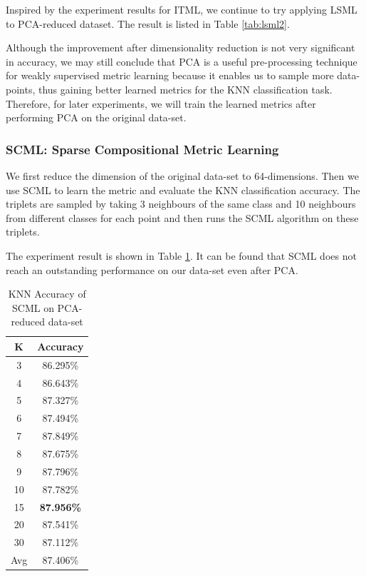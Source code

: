 Inspired by the experiment results for ITML, we continue to try applying LSML to PCA-reduced dataset. The result is listed in Table \ref{tab:lsml2}. 

Although the improvement after dimensionality reduction is not very significant in accuracy, we may still conclude that PCA is a useful pre-processing technique for weakly supervised metric learning because it enables us to sample more data-points, thus gaining better learned metrics for the KNN classification task. Therefore, for later experiments, we will train the learned metrics after performing PCA on the original data-set.


\subsubsection{SCML: Sparse Compositional Metric Learning}

We first reduce the dimension of the original data-set to 64-dimensions. Then we use SCML to learn the metric and evaluate the KNN classification accuracy. The triplets are sampled by taking 3 neighbours of the same class and 10 neighbours from different classes for each point and then runs the SCML algorithm on these triplets.

The experiment result is shown in Table \ref{tab:scml}. It can be found that SCML does not reach an outstanding performance on our data-set even after PCA.

\begin{table}[h]
\centering
\caption{KNN Accuracy of SCML on PCA-reduced data-set \label{tab:scml}}
\begin{tabular}{cc}
\hline
K   & Accuracy \\ \hline
3   & 86.295\% \\
4   & 86.643\% \\
5   & 87.327\% \\
6   & 87.494\% \\
7   & 87.849\% \\
8   & 87.675\% \\
9   & 87.796\% \\
10  & 87.782\% \\
15  & \textbf{87.956\%} \\
20  & 87.541\% \\
30  & 87.112\% \\ \hline
Avg & 87.406\% \\ \hline
\end{tabular}
\end{table}


